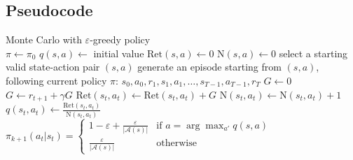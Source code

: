     \subsection{Pseudocode}
        {Monte Carlo with $\varepsilon$-greedy policy}
        {
             \\
        }
        {
        }
        {
            {
                $\pi \leftarrow \pi_0$\;
                $q(s,a) \leftarrow$ initial value\;
                $\text{Ret}(s,a) \leftarrow 0$\;
                $\text{N}(s,a) \leftarrow 0$\;
            }
            {
                select a starting valid state-action pair $(s,a)$\;
                generate an episode starting from $(s,a)$, following current policy $\pi$: $s_0, a_0, r_1, s_1, a_1, \dots, s_{T-1}, a_{T-1}, r_T$\;
                $G \leftarrow 0$\;
                {
                    $G \leftarrow r_{t+1} + \gamma G$\;
                    $\text{Ret}(s_t,a_t) \leftarrow \text{Ret}(s_t,a_t) + G$\;
                    $\text{N}(s_t,a_t) \leftarrow \text{N}(s_t,a_t) + 1$\;
                    $q(s_t,a_t) \leftarrow \frac{\text{Ret}(s_t,a_t)}{\text{N}(s_t,a_t)}$\;
                    $\pi_{k+1}(a_t|s_t) = \begin{cases}
                        1 - \varepsilon + \frac{\varepsilon}{|\mathcal{A}(s)|} &\text{if } a = \arg\max_{a'}{q(s,a)} \\
                        \frac{\varepsilon}{|\mathcal{A}(s)|} &\text{otherwise}
                    \end{cases}$\;
                }
            }
        }
        

